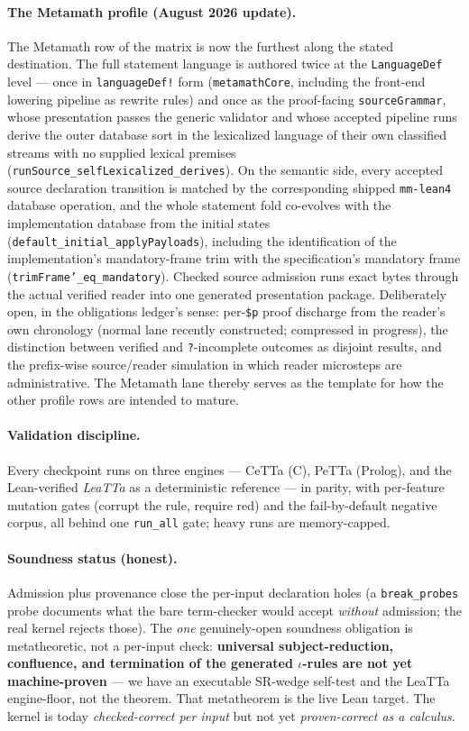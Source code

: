 \documentclass[11pt]{article}
\newcommand{\CeTTa}{CeTTa}
\newcommand{\code}[1]{\texttt{#1}}
\begin{document}
\paragraph{The Metamath profile (August 2026 update).} The Metamath row of the
matrix is now the furthest along the stated destination.  The full statement
language is authored twice at the \code{LanguageDef} level --- once in
\code{languageDef!} form (\code{metamathCore}, including the front-end
lowering pipeline as rewrite rules) and once as the proof-facing
\code{sourceGrammar}, whose presentation passes the generic validator and
whose accepted pipeline runs derive the outer database sort in the
lexicalized language of their own classified streams with no supplied lexical
premises (\code{runSource\_selfLexicalized\_derives}).  On the semantic side,
every accepted source declaration transition is matched by the corresponding
shipped \code{mm-lean4} database operation, and the whole statement fold
co-evolves with the implementation database from the initial states
(\code{default\_initial\_applyPayloads}), including the identification of the
implementation's mandatory-frame trim with the specification's mandatory
frame (\code{trimFrame'\_eq\_mandatory}).  Checked source admission runs
exact bytes through the actual verified reader into one generated
presentation package.  Deliberately open, in the obligations ledger's sense:
per-\code{\$p} proof discharge from the reader's own chronology (normal lane
recently constructed; compressed in progress), the distinction between
verified and \code{?}-incomplete outcomes as disjoint results, and the
prefix-wise source/reader simulation in which reader microsteps are
administrative.  The Metamath lane thereby serves as the template for how the
other profile rows are intended to mature.

\paragraph{Validation discipline.} Every checkpoint runs on three engines --- \CeTTa{}
(C), PeTTa (Prolog), and the Lean-verified \emph{LeaTTa} as a deterministic reference ---
in parity, with per-feature mutation gates (corrupt the rule, require red) and the
fail-by-default negative corpus, all behind one \code{run\_all} gate; heavy runs are
memory-capped.

\paragraph{Soundness status (honest).} Admission plus provenance close the per-input
declaration holes (a \code{break\_probes} probe documents what the bare term-checker
would accept \emph{without} admission; the real kernel rejects those). The \emph{one}
genuinely-open soundness obligation is metatheoretic, not a per-input check:
\textbf{universal subject-reduction, confluence, and termination of the generated
$\iota$-rules are not yet machine-proven} --- we have an executable SR-wedge self-test
and the LeaTTa engine-floor, not the theorem. That metatheorem is the live Lean target.
The kernel is today \emph{checked-correct per input} but not yet \emph{proven-correct as
a calculus}.
\end{document}
